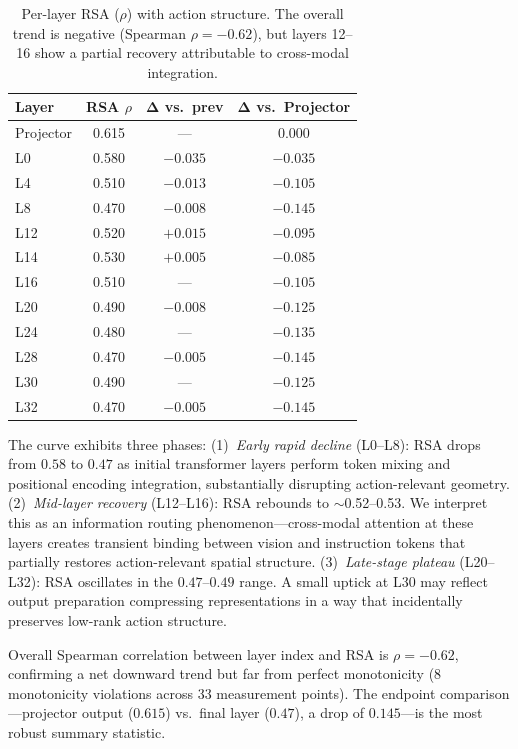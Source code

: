 \documentclass[letterpaper]{article}
\begin{document}
\begin{table}[h]
\centering
\caption{Per-layer RSA ($\rho$) with action structure. The overall trend is negative (Spearman $\rho=-0.62$), but layers 12--16 show a partial recovery attributable to cross-modal integration.}
\label{tab:perlayer}
\begin{tabular}{lccc}
\toprule
\textbf{Layer} & \textbf{RSA $\rho$} & $\boldsymbol{\Delta}$ \textbf{vs.\ prev} & $\boldsymbol{\Delta}$ \textbf{vs.\ Projector} \\
\midrule
Projector & 0.615 & --- & 0.000 \\
L0 & 0.580 & $-0.035$ & $-0.035$ \\
L4 & 0.510 & $-0.013$ & $-0.105$ \\
L8 & 0.470 & $-0.008$ & $-0.145$ \\
L12 & 0.520 & $+0.015$ & $-0.095$ \\
L14 & 0.530 & $+0.005$ & $-0.085$ \\
L16 & 0.510 & --- & $-0.105$ \\
L20 & 0.490 & $-0.008$ & $-0.125$ \\
L24 & 0.480 & --- & $-0.135$ \\
L28 & 0.470 & $-0.005$ & $-0.145$ \\
L30 & 0.490 & --- & $-0.125$ \\
L32 & 0.470 & $-0.005$ & $-0.145$ \\
\bottomrule
\end{tabular}
\end{table}

The curve exhibits three phases:
(1)~\emph{Early rapid decline} (L0--L8): RSA drops from $0.58$ to $0.47$ as initial transformer layers perform token mixing and positional encoding integration, substantially disrupting action-relevant geometry.
(2)~\emph{Mid-layer recovery} (L12--L16): RSA rebounds to $\sim$0.52--0.53. We interpret this as an information routing phenomenon---cross-modal attention at these layers creates transient binding between vision and instruction tokens that partially restores action-relevant spatial structure.
(3)~\emph{Late-stage plateau} (L20--L32): RSA oscillates in the $0.47$--$0.49$ range. A small uptick at L30 may reflect output preparation compressing representations in a way that incidentally preserves low-rank action structure.

Overall Spearman correlation between layer index and RSA is $\rho=-0.62$, confirming a net downward trend but far from perfect monotonicity (8 monotonicity violations across 33 measurement points).
The endpoint comparison---projector output ($0.615$) vs.\ final layer ($0.47$), a drop of $0.145$---is the most robust summary statistic.
\end{document}
